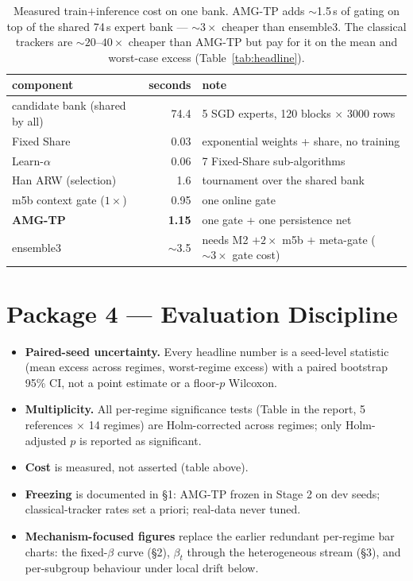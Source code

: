 \documentclass[11pt]{article}
\begin{document}
\begin{table}[H]
\centering
\small
\begin{tabular}{@{}lrl@{}}
\toprule
component & seconds & note \\
\midrule
candidate bank (shared by all) & 74.4 & 5 SGD experts, 120 blocks $\times$ 3000 rows \\
Fixed Share & 0.03 & exponential weights + share, no training \\
Learn-$\alpha$ & 0.06 & 7 Fixed-Share sub-algorithms \\
Han ARW (selection) & 1.6 & tournament over the shared bank \\
m5b context gate ($1\times$) & 0.95 & one online gate \\
\textbf{AMG-TP} & \textbf{1.15} & one gate + one persistence net \\
ensemble3 & $\sim$3.5 & needs M2 $+ 2\times$ m5b $+$ meta-gate ($\sim 3\times$ gate cost) \\
\bottomrule
\end{tabular}
\caption{Measured train$+$inference cost on one bank. AMG-TP adds $\sim$1.5\,s of
gating on top of the shared 74\,s expert bank --- $\sim 3\times$ cheaper than
ensemble3. The classical trackers are $\sim 20$--$40\times$ cheaper than AMG-TP
but pay for it on the mean and worst-case excess (Table~\ref{tab:headline}).}
\end{table}

\section{Package 4 --- Evaluation Discipline}

\begin{itemize}[nosep]
\item \textbf{Paired-seed uncertainty.} Every headline number is a seed-level
statistic (mean excess across regimes, worst-regime excess) with a paired
bootstrap 95\% CI, not a point estimate or a floor-$p$ Wilcoxon.
\item \textbf{Multiplicity.} All per-regime significance tests
(Table in the report, 5 references $\times$ 14 regimes) are Holm-corrected across
regimes; only Holm-adjusted $p$ is reported as significant.
\item \textbf{Cost} is measured, not asserted (table above).
\item \textbf{Freezing} is documented in \S1: AMG-TP frozen in Stage 2 on dev
seeds; classical-tracker rates set a priori; real-data never tuned.
\item \textbf{Mechanism-focused figures} replace the earlier redundant
per-regime bar charts: the fixed-$\beta$ curve (\S2), $\beta_t$ through the
heterogeneous stream (\S3), and per-subgroup behaviour under local drift below.
\end{itemize}
\end{document}
